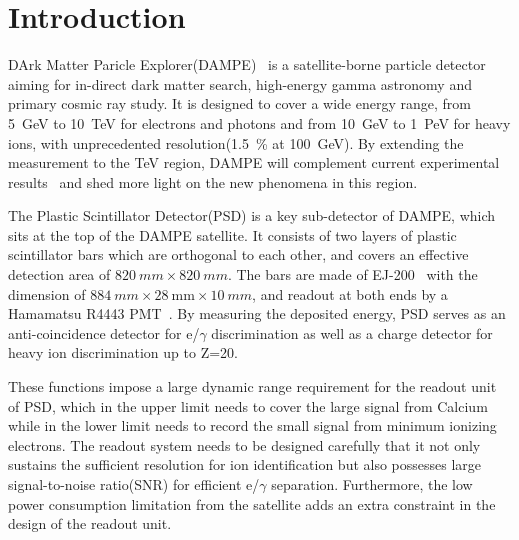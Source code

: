 \documentclass[5p, times]{elsarticle}
\begin{document}
\linenumbers
\section{Introduction}
\label{sec:introduction}

DArk Matter Paricle Explorer(DAMPE)~\cite{Chang_Jin_dampe} is a satellite-borne particle detector aiming for in-direct dark matter search, high-energy gamma astronomy and primary cosmic ray study.
It is designed to cover a wide energy range, from \SI{5}{GeV} to \SI{10}{TeV} for electrons and photons and from \SI{10}{GeV} to \SI{1}{PeV} for heavy ions, with unprecedented resolution(\SI{1.5}{\percent} at \SI{100}{\giga\electronvolt}).
By extending the measurement to the \si{TeV} region, DAMPE will complement current experimental results~\cite{guzik_advanced_1999,picozza2010instrument,aguilar2013first} and shed more light on the new phenomena in this region. 

The Plastic Scintillator Detector(PSD) is a key sub-detector of DAMPE, which sits at the top of the DAMPE satellite.
It consists of two layers of plastic scintillator bars which are orthogonal to each other, and covers an effective detection area of $\SI{820}{mm}\times\SI{820}{mm}$.
The bars are made of EJ-200~\cite{scintillator} with the dimension of $\SI{884}{mm} \times \SI{28}{\milli\meter} \times \SI{10}{mm}$, and readout at both ends by a Hamamatsu R4443 PMT~\cite{r4443}.
By measuring the deposited energy, PSD serves as an anti-coincidence detector for e/$\gamma$ discrimination as well as a charge detector for heavy ion discrimination up to Z=20.

These functions impose a large dynamic range requirement for the readout unit of PSD, which in the upper limit needs to cover the large signal from Calcium while in the lower limit needs to record the small signal from minimum ionizing electrons. 
The readout system needs to be designed carefully that it not only sustains the sufficient resolution for ion identification but also possesses large signal-to-noise ratio(SNR) for efficient e/$\gamma$ separation.
Furthermore, the low power consumption limitation from the satellite adds an extra constraint in the design of the readout unit.
\end{document}
